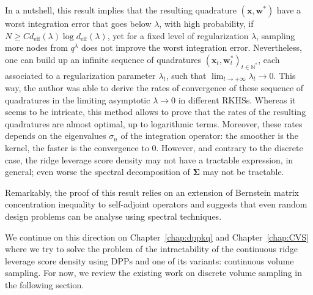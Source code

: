\documentclass[twoside,11pt]{book}
\numberwithin{theorem}{chapter}
\numberwithin{definition}{chapter}
\numberwithin{proposition}{chapter}
\numberwithin{corollary}{chapter}
\numberwithin{example}{chapter}
\numberwithin{lemma}{chapter}
\numberwithin{assumption}{chapter}
\numberwithin{equation}{chapter}
\numberwithin{figure}{chapter}
\DeclareMathOperator{\Tr}{Tr}
\DeclareMathOperator{\eff}{\mathrm{eff}}
\DeclareMathOperator{\F}{\mathcal{F}}
\begin{document}
In a nutshell, this result implies that the resulting quadrature $(\bm{x}, \bm{w}^{*})$ have a worst integration error that goes below $\lambda$, with high probability, if $N \geq C d_{\eff}(\lambda) \log d_{\eff}(\lambda)$, yet for a fixed level of regularization $\lambda$, sampling more nodes from $q^{\lambda}$ does not improve the worst integration error. 
Nevertheless, one can build up an infinite sequence of quadratures $(\bm{x}_{t}, \bm{w}^{*}_{t})_{t \in \mathbb{N}^{*}}$, each associated to a regularization parameter $\lambda_{t}$, such that $\lim_{t \rightarrow +\infty}\lambda_{t} \rightarrow 0$. This way, the author was able to derive the rates of convergence of these sequence of quadratures in the limiting asymptotic $\lambda \rightarrow 0$ in different RKHSs. Whereas it seems to be intricate, this method allows to prove that the rates of the resulting quadratures are almost optimal, up to logarithmic terms. Moreover, these rates depends on the eigenvalues $\sigma_{n}$ of the integration operator: the smoother is the kernel, the faster is the convergence to $0$. 
However, and contrary to the discrete case, the ridge leverage score density may not have a tractable expression, in general; even worse the spectral decomposition of $\bm{\Sigma}$ may not be tractable.


Remarkably, the proof of this result relies on an extension of Bernstein matrix concentration inequality to self-adjoint operators \citep{Min17} and suggests that even random design problems can be analyse using spectral techniques. 

We continue on this direction on Chapter~\ref{chap:dppkq} and Chapter~\ref{chap:CVS} where we try to solve the problem of the intractability of the continuous ridge leverage score density using DPPs and one of its variants: continuous volume sampling. For now, we review the existing work on discrete volume sampling in the following section.

\end{document}
